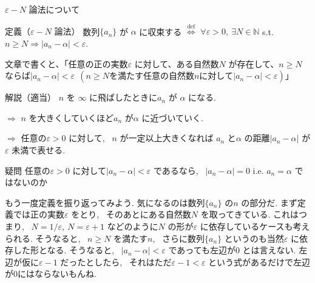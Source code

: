 \documentclass[10pt]{jsarticle}
\begin{document}
\begin{center}
  \begin{Huge}
    $\varepsilon - N$ 論法について
  \end{Huge}
\end{center}

\bigskip

\begin{itembox}[l]{定義（$\varepsilon - N$ 論法）}
  数列$\{a_n\}$ が $\alpha$ に収束する
  $\overset{\mathrm{def}}{\iff}$
  $\forall \varepsilon > 0, \ \exists N \in \mathbb{N}$ s.t.
  $n \ge N \Longrightarrow |a_n - \alpha| < \varepsilon$.
\end{itembox}

文章で書くと、「任意の正の実数$\varepsilon$ に対して、ある自然数$N$ が存在して、$n \ge N$ ならば$|a_n - \alpha| < \varepsilon \ \ (n \ge Nを満たす任意の自然数nに対して|a_n - \alpha| < \varepsilon)」$

\bigskip
\bigskip

\begin{itembox}[l]{解説（適当）}
  $n$ を $\infty$ に飛ばしたときに$a_n$ が $\alpha$ になる.

  $\Longrightarrow$ $n$ を大きくしていくほど$a_n$ が$\alpha$ に近づいていく.

  $\Longrightarrow$ 任意の$\varepsilon > 0$ に対して, \ $n$ が一定以上大きくなれば $a_n$ と$\alpha$ の距離$|a_n - \alpha|$ が$\varepsilon$ 未満で表せる.
\end{itembox}

\bigskip
\bigskip

\begin{itembox}[l]{疑問}
  任意の$\varepsilon > 0$ に対して$|a_n - \alpha| < \varepsilon$ であるなら, \ $|a_n - \alpha| = 0$ i.e. $a_n = \alpha$ ではないのか
\end{itembox}
もう一度定義を振り返ってみよう. 気になるのは数列$\{a_n\}$ の$n$ の部分だ. まず定義では正の実数$\varepsilon$ をとり, \ そのあとにある自然数$N$ を取ってきている. これはつまり, \ $N = 1/\varepsilon, \ N = \varepsilon + 1$ などのように$N$ の形が$\varepsilon$ に依存しているケースも考えられる. そうなると, \ $n \ge N$ を満たす$n$, \ さらに数列$\{a_n\}$ というのも当然$\varepsilon$ に依存した形となる. そうなると, \ $|a_n - \alpha| < \varepsilon$ であっても左辺が$0$ とは言えない. 左辺が仮に$\varepsilon - 1$ だったとしたら, \ それはただ$\varepsilon - 1 < \varepsilon$ という式があるだけで左辺が$0$にはならないもんね.

\bigskip
\bigskip
\end{document}
